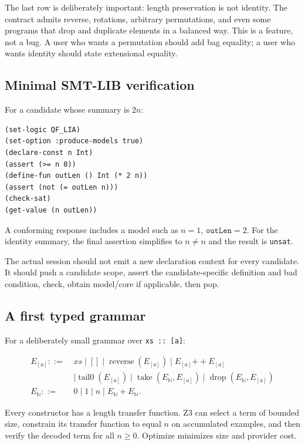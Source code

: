 \documentclass[11pt,oneside]{article}
\newcommand{\code}[1]{\texttt{#1}}
\begin{document}
The last row is deliberately important: length preservation is not identity. The
contract admits reverse, rotations, arbitrary permutations, and even some programs
that drop and duplicate elements in a balanced way. This is a feature, not a bug. A
user who wants a permutation should add bag equality; a user who wants identity should
state extensional equality.

\subsection{Minimal SMT-LIB verification}

For a candidate whose summary is $2n$:

\begin{lstlisting}[language=SMTLIB,caption={Counterexample query for duplicating the list}]
(set-logic QF_LIA)
(set-option :produce-models true)
(declare-const n Int)
(assert (>= n 0))
(define-fun outLen () Int (* 2 n))
(assert (not (= outLen n)))
(check-sat)
(get-value (n outLen))
\end{lstlisting}

A conforming response includes a model such as $n=1$, $\texttt{outLen}=2$. For the
identity summary, the final assertion simplifies to $n\neq n$ and the result is
\code{unsat}.

The actual session should not emit a new declaration context for every candidate. It
should push a candidate scope, assert the candidate-specific definition and bad
condition, check, obtain model/core if applicable, then pop.

\subsection{A first typed grammar}

For a deliberately small grammar over \code{xs :: [a]}:

\[
\begin{aligned}
E_{[a]} ::=\;& xs \mid [] \mid \operatorname{reverse}(E_{[a]})
              \mid E_{[a]} \mathbin{++} E_{[a]} \\
            &\mid \operatorname{tail0}(E_{[a]})
              \mid \operatorname{take}(E_{\mathbb{N}},E_{[a]})
              \mid \operatorname{drop}(E_{\mathbb{N}},E_{[a]}) \\
E_{\mathbb{N}} ::=\;& 0 \mid 1 \mid n \mid E_{\mathbb{N}}+E_{\mathbb{N}}.
\end{aligned}
\]

Every constructor has a length transfer function. Z3 can select a term of bounded
size, constrain its transfer function to equal $n$ on accumulated examples, and then
verify the decoded term for all $n\geq0$. Optimize minimizes size and provider cost.
\end{document}
